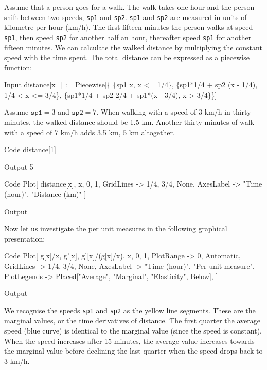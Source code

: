 \documentclass[11pt,fleqn]{book} %
\begin{document}
\begin{theorem}
\hfill \break
Assume that a person goes for a walk. The walk takes one hour and the person shift between two speeds, \texttt{sp1} and \texttt{sp2}. \texttt{sp1} and \texttt{sp2} are measured in units of kilometre per hour (km/h). The first fifteen minutes the person walks at speed \texttt{sp1}, then speed \texttt{sp2} for another half an hour, thereafter speed \texttt{sp1} for another fifteen minutes. We can calculate the walked distance by multiplying the constant speed with the time spent. The total distance can be expressed as a piecewise function:
\begin{mmaCell}[index=1]{Input}
  distance[x_] := Piecewise[\{
  \{sp1 x, x <= 1/4\}, 
  \{sp1*1/4 + sp2 (x - 1/4), 1/4 < x <= 3/4\}, 
  \{sp1*1/4 + sp2 2/4 + sp1*(x - 3/4), x > 3/4\}\}]
\end{mmaCell}
Assume $\texttt{sp1} = 3$ and $\texttt{sp2} = 7$. When walking with a speed of 3 km/h in thirty minutes, the walked distance should be 1.5 km. Another thirty minutes of walk with a speed of 7 km/h adds 3.5 km, 5 km altogether.
\begin{mmaCell}[index=2]{Code}
  distance[1]
\end{mmaCell}
\begin{mmaCell}{Output}
  5
\end{mmaCell}
\begin{mmaCell}[index=3]{Code}
  Plot[
    distance[x], {x, 0, 1}, 
    GridLines -> {{1/4, 3/4}, None},
    AxesLabel -> {"Time (hour)", "Distance (km)"}
  ]
\end{mmaCell}
\begin{mmaCell}[moregraphics={moreig={scale=.7}}]{Output}
\end{mmaCell}
Now let us investigate the per unit measures in the following graphical presentation:
\begin{mmaCell}[index=4]{Code}
  Plot[
    {g[x]/x, g'[x], g'[x]/(g[x]/x)}, {x, 0, 1}, 
    PlotRange   -> {0, Automatic}, 
    GridLines   -> {{1/4, 3/4}, None}, 
    AxesLabel   -> {"Time (hour)", "Per unit measure"},
    PlotLegends -> 
      Placed[{"Average", "Marginal", "Elasticity"}, Below],
  ]
\end{mmaCell}
\begin{mmaCell}[moregraphics={moreig={scale=.9}}]{Output}
\end{mmaCell}
We recognise the speeds \texttt{sp1} and \texttt{sp2} as the yellow line segments. These are the marginal values, or the time derivatives of distance. The first quarter the average speed (blue curve) is identical to the marginal value (since the speed is constant). When the speed increases after 15 minutes, the average value increases towards the marginal value before declining the last quarter when the speed drops back to 3 km/h.


\end{theorem}
\end{document}
